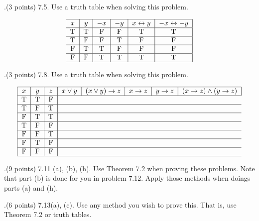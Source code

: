\documentclass[12pt]{article}
\begin{document}
.(3 points) 7.5.  Use a truth table when solving this problem.      
\vspace{.15in}

\[ %
\begin{tabular}{|c|c|c|c|c|c|} 
\hline %
$x$ & $y$ & $-x$ & $-y$ & $x\leftrightarrow y$ & $-x \leftrightarrow -y$ \\ 
\hline
T&T&F&F&T&T \\
\hline 
T&F&F&T&F&F \\
\hline
F&T&T&F&F&F \\
\hline
F&F&T&T&T&T \\
\hline
\end{tabular} %
\] %




.(3 points) 7.8.  Use a truth table when solving this problem. 
\vspace{.15in}

\[ %
\begin{tabular}{|c|c|c|c|c|c|c|c|} 
\hline %
$x$ & $y$ & $z$ & $x \vee y$ & $(x \vee y) \rightarrow z$ & $x\rightarrow z$ & $y \rightarrow z$ & $(x \rightarrow z) \wedge (y \rightarrow z)$ \\ 
\hline
T&T&F \\
\hline 
T&F&T \\
\hline
F&T&T \\
\hline
T&F&F \\
\hline
F&F&T \\
\hline 
F&T&F \\
\hline
F&F&F \\
\hline

\end{tabular} %
\] 

.(9 points) 7.11 (a), (b), (h).  Use Theorem 7.2 when proving these problems.  Note that part (b) is done for you in problem 7.12.  Apply those methods when doings parts (a) and (h).  
\vspace{.15in}

.(6 points) 7.13(a), (c).   Use any method you wish to prove this.  That is, use Theorem 7.2 or truth tables.   
\vspace{.05in}
\end{document}
